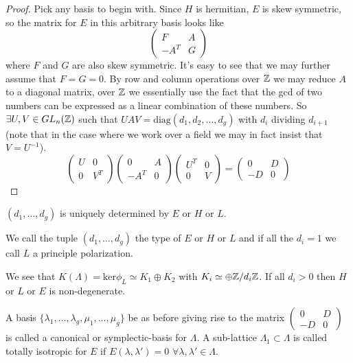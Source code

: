 \begin{paragraph}
\begin{lemma}
\end{lemma}
\begin{proof}
Pick any basis to begin with. Since $H$ is hermitian, $E$ is skew symmetric, so the matrix for $E$ in this arbitrary basis looks like
\begin{equation*} \left(\begin{array}{cc}
F& A\\
-A^T & G\end{array}
\right )
\end{equation*}
where $F$ and $G$ are also skew symmetric. It's easy to see that we may further assume that $F=G=0$. By row and column operations over ${\mathbb Z}$ we may reduce $A$ to a diagonal matrix, over ${\mathbb Z}$ we essentially use the fact that the gcd of two numbers can be expressed as a linear combination of these numbers. So $\exists U, V\in GL_n({\mathbb Z})$ such that $UAV=\text{diag}(d_1,d_2,\dots, d_g)$ with $d_i$ dividing $d_{i+1}$ (note that in the case where we work over a field we may in fact insist that $V=U^{-1}$).
\begin{equation*} \left(\begin{array}{cc}
U& 0\\
0 & V^T\end{array}
\right )
\left(\begin{array}{cc}
0& A\\
-A^T & 0\end{array}
\right )
\left(\begin{array}{cc}
U^T& 0\\
0 & V\end{array}
\right )
=\left(\begin{array}{cc}
0& D\\
-D & 0\end{array}
\right )
\end{equation*}
\end{proof}

$(d_1,\dots ,d_g)$ is uniquely determined by $E$ or $H$ or $L$.
\begin{definition} We call the tuple $(d_1,\dots, d_g)$ the type of $E$ or $H$ or $L$ and if all the $d_i=1$ we call $L$ a principle polarization.
\end{definition}
We see that $K(\Lambda)=\text{ker} \phi_L\simeq K_1\oplus K_2$ with $K_i\simeq \oplus {\mathbb Z}/d_i {\mathbb Z}$. If all $d_i>0$ then $H$ or $L$ or $E$ is non-degenerate.
\begin{definition}
A basis $\{\lambda_1,\dots, \lambda_g, \mu_1,\dots, \mu_g\}$ be as before giving rise to the matrix $\left(\begin{array}{cc}
0& D\\
-D & 0\end{array}
\right )$ is called a canonical or symplectic-basis for $\Lambda$. A sub-lattice $\Lambda_1\subset \Lambda$ is called totally isotropic for $E$ if $E(\lambda, \lambda')=0$ $\forall \lambda, \lambda'\in \Lambda$.
\end{definition}


\end{paragraph}
